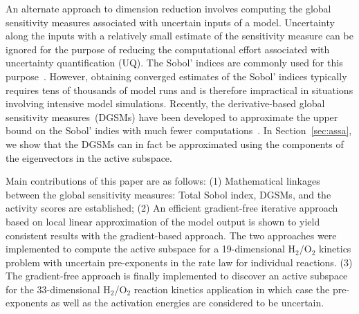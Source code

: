 An alternate approach to dimension reduction involves computing the global sensitivity
measures associated with uncertain inputs of a model. Uncertainty along the inputs with
a relatively small estimate of the sensitivity measure can be ignored for the purpose of
reducing the computational effort associated with uncertainty quantification (UQ). The
Sobol' indices are commonly used for this purpose~\cite{Sobol:2001}. However, obtaining
converged estimates of the Sobol' indices typically requires tens of thousands of model
runs and is therefore impractical in situations involving intensive model simulations.
Recently, the derivative-based global sensitivity measures~(DGSMs) have been 
developed to approximate the upper bound on the Sobol' indies with much fewer
computations~\cite{Sobol:2009, Lamboni:2013}. In Section~\ref{sec:assa}, we show
that the DGSMs can in fact be approximated using the components of the eigenvectors
in the active subspace. 

Main contributions of this paper are as follows: (1) Mathematical linkages between the
global sensitivity measures: Total Sobol index, DGSMs, and the activity scores are
established; (2) An efficient gradient-free iterative approach based on local linear
approximation of the model output is shown to yield consistent results with the
gradient-based approach. The two approaches were implemented to compute
the active subspace for a 19-dimensional H$_2$/O$_2$ kinetics problem with 
uncertain pre-exponents in the rate law for individual reactions. (3) The gradient-free
approach is finally implemented to discover an active subspace for the 33-dimensional
H$_2$/O$_2$ reaction kinetics application in which case the pre-exponents as well
as the activation energies are considered to be uncertain. 
 
